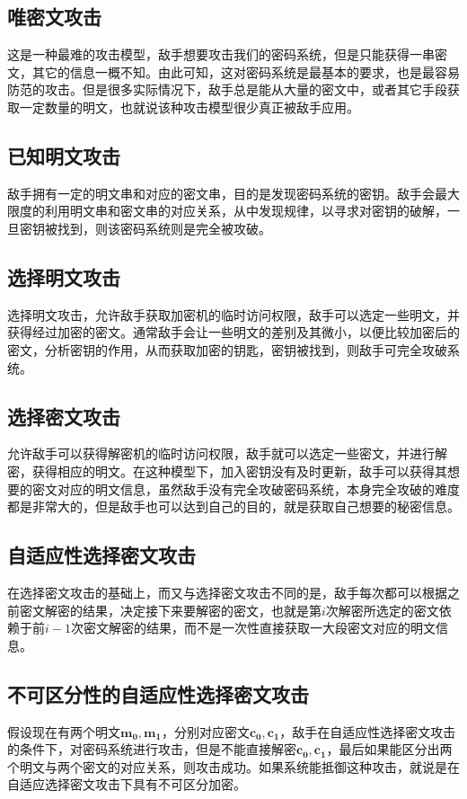 \subsection{唯密文攻击}
这是一种最难的攻击模型，敌手想要攻击我们的密码系统，但是只能获得一串密文，其它的信息一概不知。由此可知，这对密码系统是最基本的要求，也是最容易防范的攻击。但是很多实际情况下，敌手总是能从大量的密文中，或者其它手段获取一定数量的明文，也就说该种攻击模型很少真正被敌手应用。

\subsection{已知明文攻击}
敌手拥有一定的明文串和对应的密文串，目的是发现密码系统的密钥。敌手会最大限度的利用明文串和密文串的对应关系，从中发现规律，以寻求对密钥的破解，一旦密钥被找到，则该密码系统则是完全被攻破。

\subsection{选择明文攻击}
选择明文攻击，允许敌手获取加密机的临时访问权限，敌手可以选定一些明文，并获得经过加密的密文。通常敌手会让一些明文的差别及其微小，以便比较加密后的密文，分析密钥的作用，从而获取加密的钥匙，密钥被找到，则敌手可完全攻破系统。

\subsection{选择密文攻击}
允许敌手可以获得解密机的临时访问权限，敌手就可以选定一些密文，并进行解密，获得相应的明文。在这种模型下，加入密钥没有及时更新，敌手可以获得其想要的密文对应的明文信息，虽然敌手没有完全攻破密码系统，本身完全攻破的难度都是非常大的，但是敌手也可以达到自己的目的，就是获取自己想要的秘密信息。

\subsection{自适应性选择密文攻击}
在选择密文攻击的基础上，而又与选择密文攻击不同的是，敌手每次都可以根据之前密文解密的结果，决定接下来要解密的密文，也就是第$i$次解密所选定的密文依赖于前$i - 1$次密文解密的结果，而不是一次性直接获取一大段密文对应的明文信息。

\subsection{不可区分性的自适应性选择密文攻击}
假设现在有两个明文$\mathbf{m_0},\mathbf{m_1}$，分别对应密文$\mathbf{c_0},\mathbf{c_1}$，敌手在自适应性选择密文攻击的条件下，对密码系统进行攻击，但是不能直接解密$\mathbf{c_0},\mathbf{c_1}$，最后如果能区分出两个明文与两个密文的对应关系，则攻击成功。如果系统能抵御这种攻击，就说是在自适应选择密文攻击下具有不可区分加密。

